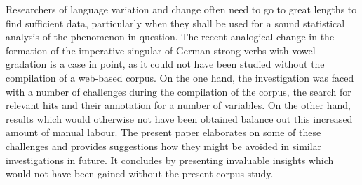 Researchers of language variation and change often need to go to great lengths to find sufficient data, particularly when they shall be used for a sound statistical analysis of the phenomenon in question. The recent analogical change in the formation of the imperative singular of German strong verbs with vowel gradation is a case in point, as it could not have been studied without the compilation of a web-based corpus. On the one hand, the investigation was faced with a number of challenges during the compilation of the corpus, the search for relevant hits and their annotation for a number of variables. On the other hand, results which would otherwise not have been obtained balance out this increased amount of manual labour. The present paper elaborates on some of these challenges and provides suggestions how they might be avoided in similar investigations in future. It concludes by presenting invaluable insights which would not have been gained without the present corpus study.
